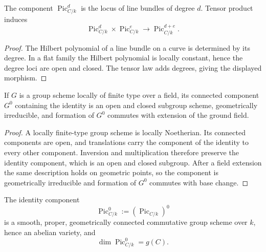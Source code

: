\begin{definition}
  \label{mk-def-picard-degree}
  \cite{kleiman-picard}
  The component \(\operatorname{Pic}^d_{C/k}\) is the locus of line bundles of
  degree \(d\).  Tensor product induces
  \[
    \operatorname{Pic}^d_{C/k}\times\operatorname{Pic}^e_{C/k}
    \longrightarrow\operatorname{Pic}^{d+e}_{C/k}.
  \]
\end{definition}

\begin{proof}
  The Hilbert polynomial of a line bundle on a curve is determined by its
  degree.  In a flat family the Hilbert polynomial is locally constant, hence
  the degree loci are open and closed.  The tensor law adds degrees, giving
  the displayed morphism.
\end{proof}

\begin{theorem}
  \label{mk-thm-identity-component}
  \cite[Lem.~5.1]{kleiman-picard}
  If \(G\) is a group scheme locally of finite type over a field, its connected
  component \(G^0\) containing the identity is an open and closed subgroup
  scheme, geometrically irreducible, and formation of \(G^0\) commutes with
  extension of the ground field.
\end{theorem}

\begin{proof}
  A locally finite-type group scheme is locally Noetherian.  Its connected
  components are open, and translations carry the component of the identity
  to every other component.  Inversion and multiplication therefore preserve
  the identity component, which is an open and closed subgroup.  After a
  field extension the same description holds on geometric points, so the
  component is geometrically irreducible and formation of \(G^0\) commutes
  with base change.
\end{proof}

\begin{theorem}
  \label{mk-thm-pic0-abelian}
  \cite[Thms.~5.4 and 5.11, Cors.~5.13--5.14]{kleiman-picard}
  The identity component
  \[
    \operatorname{Pic}^0_{C/k}:=(\operatorname{Pic}_{C/k})^0
  \]
  is a smooth, proper, geometrically connected commutative group scheme over
  \(k\), hence an abelian variety, and
  \[
    \dim\operatorname{Pic}^0_{C/k}=g(C).
  \]
\end{theorem}

